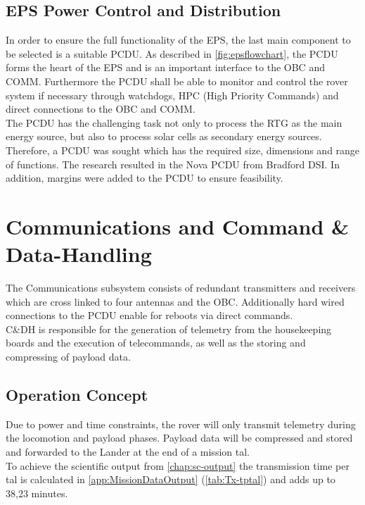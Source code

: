 \subsection{EPS Power Control and Distribution}
In order to ensure the full functionality of the EPS, the last main component to be selected is a suitable PCDU. As described in \autoref{fig:epsflowchart}, the PCDU forms the heart of the EPS and is an important interface to the OBC and COMM. Furthermore the PCDU shall be able to monitor and control the rover system if necessary through watchdogs, HPC (High Priority Commands) and direct connections to the OBC and COMM.\\
The PCDU has the challenging task not only to process the RTG as the main energy source, but also to process solar cells as secondary energy sources. Therefore, a PCDU was sought which has the required size, dimensions and range of functions. The research resulted in the Nova PCDU from Bradford DSI. In addition, margins were added to the PCDU to ensure feasibility\cite{BradfordSpace.2019}.

\clearpage

\section{Communications and Command \& Data-Handling}
\label{sec:comm}
The Communications subsystem consists of redundant transmitters and receivers which are cross linked to four antennas and the OBC. Additionally hard wired connections to the PCDU enable for reboots via direct commands.\\
C\&DH is responsible for the generation of telemetry from the housekeeping boards and the execution of telecommands, as well as the storing and compressing of payload data. 

\subsection{Operation Concept}

Due to power and time constraints, the rover will only transmit telemetry during the locomotion and payload phases. Payload data will be compressed and stored and forwarded to the Lander at the end of a mission tal. \\ 
 
To achieve the scientific output from \autoref{chap:sc-output} the transmission time per tal is calculated in \autoref{app:MissionDataOutput} (\autoref{tab:Tx-tptal}) and adds up to 38,23 minutes. 
	
